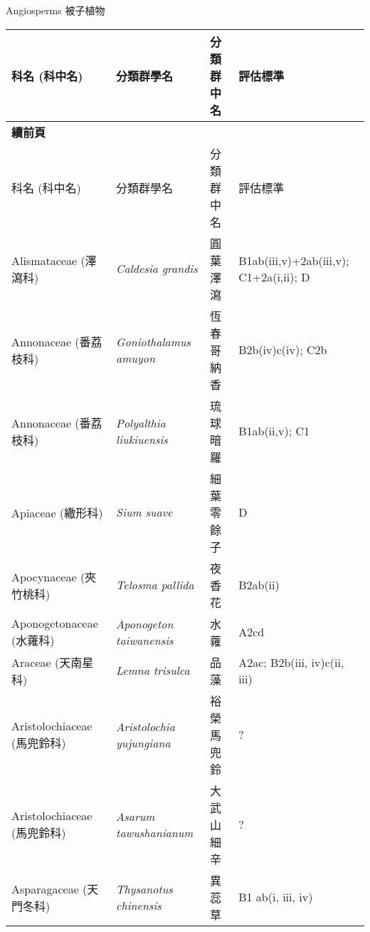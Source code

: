 \noindent\normalfont\selectfont Angiosperms 被子植物
\footnotesize\selectfont
        \begin{longtable}{p{3cm}p{5cm}p{3cm}p{4cm}}
        \toprule
          科名 (科中名) & 分類群學名 & 分類群中名 & 評估標準 \\
        \midrule 
        \endfirsthead

        {{\bfseries 續前頁 }} \\
        科名 (科中名) & 分類群學名 & 分類群中名 & 評估標準 \\
        \midrule
        \endhead
                Alismataceae (澤瀉科) & \textit{Caldesia grandis}  & 圓葉澤瀉 & B1ab(iii,v)+2ab(iii,v); C1+2a(i,ii); D \index{Caldesia@\textit{Caldesia}!grandis@\textit{grandis}}  \index{圓葉澤瀉} \\
    Annonaceae (番荔枝科) & \textit{Goniothalamus amuyon}  & 恆春哥納香 & B2b(iv)c(iv); C2b \index{Goniothalamus@\textit{Goniothalamus}!amuyon@\textit{amuyon}}  \index{恆春哥納香} \\
    Annonaceae (番荔枝科) & \textit{Polyalthia liukiuensis}  & 琉球暗羅 & B1ab(ii,v); C1 \index{Polyalthia@\textit{Polyalthia}!liukiuensis@\textit{liukiuensis}}  \index{琉球暗羅} \\
    Apiaceae (繖形科) & \textit{Sium suave}  & 細葉零餘子 & D \index{Sium@\textit{Sium}!suave@\textit{suave}}  \index{細葉零餘子} \\
    Apocynaceae (夾竹桃科) & \textit{Telosma pallida}  & 夜香花 & B2ab(ii) \index{Telosma@\textit{Telosma}!pallida@\textit{pallida}}  \index{夜香花} \\
    Aponogetonaceae (水蕹科) & \textit{Aponogeton taiwanensis}  & 水蕹 & A2cd \index{Aponogeton@\textit{Aponogeton}!taiwanensis@\textit{taiwanensis}}  \index{水蕹} \\
    Araceae (天南星科) & \textit{Lemna trisulca}  & 品藻 & A2ac; B2b(iii, iv)c(ii, iii) \index{Lemna@\textit{Lemna}!trisulca@\textit{trisulca}}  \index{品藻} \\
    Aristolochiaceae (馬兜鈴科) & \textit{Aristolochia yujungiana}  & 裕榮馬兜鈴 & ? \index{Aristolochia@\textit{Aristolochia}!yujungiana@\textit{yujungiana}}  \index{裕榮馬兜鈴} \\
    Aristolochiaceae (馬兜鈴科) & \textit{Asarum tawushanianum}  & 大武山細辛 & ? \index{Asarum@\textit{Asarum}!tawushanianum@\textit{tawushanianum}}  \index{大武山細辛} \\
    Asparagaceae (天門冬科) & \textit{Thysanotus chinensis}  & 異蕊草 & B1 ab(i, iii, iv) \index{Thysanotus@\textit{Thysanotus}!chinensis@\textit{chinensis}}  \index{異蕊草} \\

\end{longtable}
